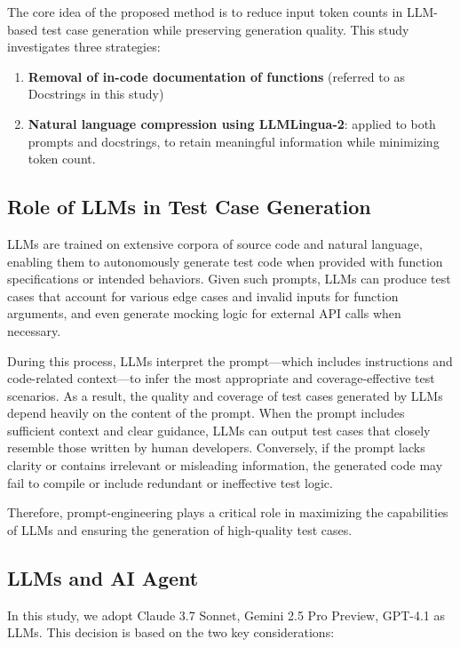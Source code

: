 The core idea of the proposed method is to reduce input token counts in LLM-based test case generation while preserving generation quality. This study investigates three strategies:

\begin{enumerate}
    \item \textbf{Removal of in-code documentation of functions} (referred to as Docstrings in this study)
\vspace{0.2cm}
    \item \textbf{Natural language compression using LLMLingua-2}: applied to both prompts and docstrings, to retain meaningful information while minimizing token count.
\end{enumerate}

\subsection{Role of LLMs in Test Case Generation}
LLMs are trained on extensive corpora of source code and natural language, enabling them to autonomously generate test code when provided with function specifications or intended behaviors. Given such prompts, LLMs can produce test cases that account for various edge cases and invalid inputs for function arguments, and even generate mocking logic for external API calls when necessary.

During this process, LLMs interpret the prompt—which includes instructions and code-related context—to infer the most appropriate and coverage-effective test scenarios. As a result, the quality and coverage of test cases generated by LLMs depend heavily on the content of the prompt. When the prompt includes sufficient context and clear guidance, LLMs can output test cases that closely resemble those written by human developers. Conversely, if the prompt lacks clarity or contains irrelevant or misleading information, the generated code may fail to compile or include redundant or ineffective test logic.

Therefore, prompt-engineering plays a critical role in maximizing the capabilities of LLMs and ensuring the generation of high-quality test cases.

\subsection{LLMs and AI Agent}
In this study, we adopt Claude 3.7 Sonnet, Gemini 2.5 Pro Preview, GPT-4.1 as LLMs. This decision is based on the two key considerations:

